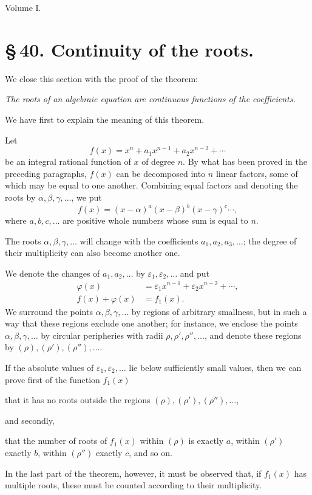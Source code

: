 \documentclass[11pt]{article}
\begin{document}
\begin{center}{\large Volume I.}\end{center}


\section*{\S\,40. Continuity of the roots.}

We close this section with the proof of the theorem:

\begin{center}
\emph{The roots of an algebraic equation are continuous functions of the coefficients.}
\end{center}

We have first to explain the meaning of this theorem.

Let
\begin{equation}
 f(x)=x^n+a_1x^{n-1}+a_2x^{n-2}+\cdots
\tag{1}
\end{equation}
be an integral rational function of $x$ of degree $n$. By what has been proved in the preceding paragraphs, $f(x)$ can be decomposed into $n$ linear factors, some of which may be equal to one another. Combining equal factors and denoting the roots by $\alpha,\beta,\gamma,\ldots$, we put
\begin{equation}
 f(x)=(x-\alpha)^a(x-\beta)^b(x-\gamma)^c\cdots,
\tag{2}
\end{equation}
where $a,b,c,\ldots$ are positive whole numbers whose sum is equal to $n$.

The roots $\alpha,\beta,\gamma,\ldots$ will change with the coefficients $a_1,a_2,a_3,\ldots$; the degree of their multiplicity can also become another one.

We denote the changes of $a_1,a_2,
\ldots$ by $\varepsilon_1,\varepsilon_2,\ldots$ and put
\begin{align}
 \varphi(x)&=\varepsilon_1x^{n-1}+\varepsilon_2x^{n-2}+\cdots,
\tag{3}\\
 f(x)+\varphi(x)&=f_1(x).
\tag{4}
\end{align}
We surround the points $\alpha,\beta,\gamma,
\ldots$ by regions of arbitrary smallness, but in such a way that these regions exclude one another; for instance, we enclose the points $\alpha,\beta,\gamma,
\ldots$ by circular peripheries with radii $\rho,\rho',\rho'',\ldots$, and denote these regions by $(\rho),(\rho'),(\rho''),\ldots$.

If the absolute values of $\varepsilon_1,\varepsilon_2,
\ldots$ lie below sufficiently small values, then we can prove first of the function $f_1(x)$
\begin{center}
that it has no roots outside the regions $(\rho),(\rho'),(\rho''),\ldots$,
\end{center}
and secondly,
\begin{center}
that the number of roots of $f_1(x)$ within $(\rho)$ is exactly $a$, within $(\rho')$ exactly $b$, within $(\rho'')$ exactly $c$, and so on.
\end{center}
In the last part of the theorem, however, it must be observed that, if $f_1(x)$ has multiple roots, these must be counted according to their multiplicity.
\end{document}
